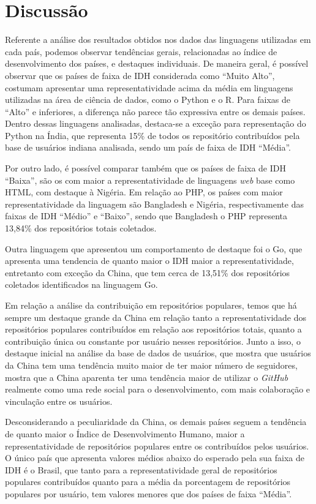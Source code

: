 \documentclass[12pt]{article}
\begin{document}
\section{Discussão} \label{sec:discussion}

Referente a análise dos resultados obtidos nos dados das linguagens utilizadas em cada país, podemos observar tendências gerais, relacionadas ao índice de desenvolvimento dos países, e destaques individuais. De maneira geral, é possível observar que os países de faixa de IDH considerada como ``Muito Alto'', costumam apresentar uma representatividade acima da média em linguagens utilizadas na área de ciência de dados, como o Python e o R. Para faixas de ``Alto'' e inferiores, a diferença não parece tão expressiva entre os demais países. Dentro dessas linguagens analisadas, destaca-se a exceção para representação do Python na Índia, que representa 15\% de todos os repositório contribuídos pela base de usuários indiana analisada, sendo um país de faixa de IDH ``Média''.

Por outro lado, é possível comparar também que os países de faixa de IDH ``Baixa'', são os com maior a representatividade de linguagens \textit{web} base como HTML, com destaque à Nigéria. Em relação ao PHP, os países com maior representatividade da linguagem são Bangladesh e Nigéria, respectivamente das faixas de IDH ``Médio'' e ``Baixo'', sendo que Bangladesh o PHP representa 13,84\% dos repositórios totais coletados.

Outra linguagem que apresentou um comportamento de destaque foi o Go, que apresenta uma tendencia de quanto maior o IDH maior a representatividade, entretanto com exceção da China, que tem cerca de 13,51\% dos repositórios coletados identificados na linguagem Go. 

Em relação a análise da contribuição em repositórios populares, temos que há sempre um destaque grande da China em relação tanto a representatividade dos repositórios populares contribuídos em relação aos repositórios totais, quanto a contribuição única ou constante por usuário nesses repositórios. Junto a isso, o destaque inicial na análise da base de dados de usuários, que mostra que usuários da China tem uma tendência muito maior de ter maior número de seguidores, mostra que a China aparenta ter uma tendência maior de utilizar o \textit{GitHub} realmente como uma rede social para o desenvolvimento, com mais colaboração e vinculação entre os usuários.

Desconsiderando a peculiaridade da China, os demais países seguem a tendência de quanto maior o Índice de Desenvolvimento Humano, maior a representatividade de repositórios populares entre os contribuídos pelos usuários. O único país que apresenta valores médios abaixo do esperado pela sua faixa de IDH é o Brasil, que tanto para a representatividade geral de repositórios populares contribuídos quanto para a média da porcentagem de repositórios populares por usuário, tem valores menores que dos países de faixa ``Média''. 
\end{document}
